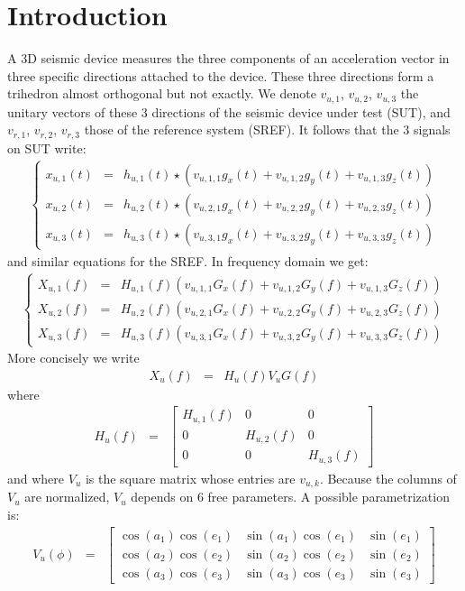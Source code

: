 \documentclass[a4paper, 12pt]{report}
\begin{document}
 \sloppy
\section{Introduction}
A 3D seismic device measures the three components of an acceleration vector in three specific directions attached to the device. These three directions form a trihedron almost orthogonal but not exactly. We denote $v_{u,1}$,  $v_{u,2}$,  $v_{u,3}$ the unitary vectors of these 3 directions of the seismic device under test (SUT), and  $v_{r,1}$,  $v_{r,2}$,  $v_{r,3}$ those of the reference system (SREF). It follows that the 3 signals on SUT write:
\begin{eqnarray*}
\left\{
\begin{array}{rcl}
x_{u,1}(t)&=&h_{u,1}(t)\star (v_{u,1,1}g_{x}(t)+v_{u,1,2}g_{y}(t)+v_{u,1,3}g_{z}(t))
\\
x_{u,2}(t)&=&h_{u,2}(t)\star (v_{u,2,1}g_{x}(t)+v_{u,2,2}g_{y}(t)+v_{u,2,3}g_{z}(t))
\\
x_{u,3}(t)&=&h_{u,3}(t)\star (v_{u,3,1}g_{x}(t)+v_{u,3,2}g_{y}(t)+v_{u,3,3}g_{z}(t))
\end{array}
\right.
\end{eqnarray*}
and similar equations for the SREF. In frequency domain we get:
\begin{eqnarray*}
\left\{
\begin{array}{rcl}
X_{u,1}(f)&=&H_{u,1}(f) (v_{u,1,1}G_{x}(f)+v_{u,1,2}G_{y}(f)+v_{u,1,3}G_{z}(f))
\\
X_{u,2}(f)&=&H_{u,2}(f) (v_{u,2,1}G_{x}(f)+v_{u,2,2}G_{y}(f)+v_{u,2,3}G_{z}(f))
\\
X_{u,3}(f)&=&H_{u,3}(f) (v_{u,3,1}G_{x}(f)+v_{u,3,2}G_{y}(f)+v_{u,3,3}G_{z}(f))
\end{array}
\right.
\end{eqnarray*}
More concisely we write
\begin{eqnarray*}
X_{u}(f)&=&H_{u}(f)V_{u}G(f)
\end{eqnarray*}
where 
\begin{eqnarray*}
H_{u}(f)&=&
\begin{bmatrix}
H_{u,1}(f)&0&0
\\
0&H_{u,2}(f)&0
\\
0&0&H_{u,3}(f)
\end{bmatrix}
\end{eqnarray*}
and where $V_{u}$ is the square matrix whose entries are $v_{u,k}$. Because the columns of $V_{u}$ are normalized, $V_{u}$ depends on 6 free parameters. A possible parametrization is:
\begin{eqnarray}
\label{eq:parametricformofV}
V_{u}(\phi)&=&
\begin{bmatrix}
\cos(a_{1})\cos(e_{1})&\sin(a_{1})\cos(e_{1})&\sin(e_{1})
\\
\cos(a_{2})\cos(e_{2})&\sin(a_{2})\cos(e_{2})&\sin(e_{2})
\\
\cos(a_{3})\cos(e_{3})&\sin(a_{3})\cos(e_{3})&\sin(e_{3})
\end{bmatrix}
\end{eqnarray}
\end{document}

